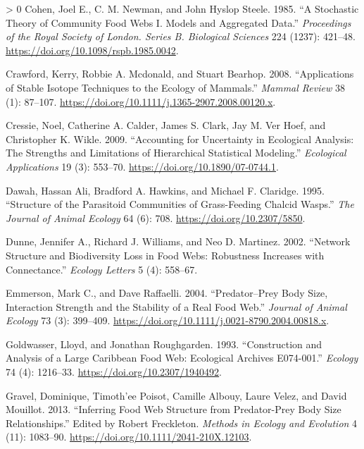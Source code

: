 \documentclass{article}
\newlength{\cslhangindent}
\newenvironment{CSLReferences}[3] %
 {%
  \setlength{\parindent}{0pt}
  \ifodd #1 \everypar{\setlength{\hangindent}{\cslhangindent}}\ignorespaces\fi
  \ifnum #2 > 0
  \setlength{\parskip}{#2\baselineskip}
  \fi
 }%
 {}
\begin{document}
\begin{CSLReferences}{1}{0}
\leavevmode\hypertarget{ref-cohenStochasticTheoryCommunity1985}{}%
Cohen, Joel E., C. M. Newman, and John Hyslop Steele. 1985. {``A
Stochastic Theory of Community Food Webs {I}. {Models} and Aggregated
Data.''} \emph{Proceedings of the Royal Society of London. Series B.
Biological Sciences} 224 (1237): 421--48.
\url{https://doi.org/10.1098/rspb.1985.0042}.

\leavevmode\hypertarget{ref-crawfordApplicationsStableIsotope2008}{}%
Crawford, Kerry, Robbie A. Mcdonald, and Stuart Bearhop. 2008.
{``Applications of Stable Isotope Techniques to the Ecology of
Mammals.''} \emph{Mammal Review} 38 (1): 87--107.
\url{https://doi.org/10.1111/j.1365-2907.2008.00120.x}.

\leavevmode\hypertarget{ref-cressieAccountingUncertaintyEcological2009}{}%
Cressie, Noel, Catherine A. Calder, James S. Clark, Jay M. Ver Hoef, and
Christopher K. Wikle. 2009. {``Accounting for Uncertainty in Ecological
Analysis: The Strengths and Limitations of Hierarchical Statistical
Modeling.''} \emph{Ecological Applications} 19 (3): 553--70.
\url{https://doi.org/10.1890/07-0744.1}.

\leavevmode\hypertarget{ref-dawahStructureParasitoidCommunities1995}{}%
Dawah, Hassan Ali, Bradford A. Hawkins, and Michael F. Claridge. 1995.
{``Structure of the {Parasitoid Communities} of {Grass}-{Feeding Chalcid
Wasps}.''} \emph{The Journal of Animal Ecology} 64 (6): 708.
\url{https://doi.org/10.2307/5850}.

\leavevmode\hypertarget{ref-dunneNetworkStructureBiodiversity}{}%
Dunne, Jennifer A., Richard J. Williams, and Neo D. Martinez. 2002.
{``Network Structure and Biodiversity Loss in Food Webs: Robustness
Increases with Connectance.''} \emph{Ecology Letters} 5 (4): 558--67.

\leavevmode\hypertarget{ref-emmersonPredatorPreyBody2004}{}%
Emmerson, Mark C., and Dave Raffaelli. 2004. {``Predator--Prey Body
Size, Interaction Strength and the Stability of a Real Food Web.''}
\emph{Journal of Animal Ecology} 73 (3): 399--409.
\url{https://doi.org/10.1111/j.0021-8790.2004.00818.x}.

\leavevmode\hypertarget{ref-goldwasserConstructionAnalysisLarge1993}{}%
Goldwasser, Lloyd, and Jonathan Roughgarden. 1993. {``Construction and
{Analysis} of a {Large Caribbean Food Web}: {Ecological Archives
E074}-001.''} \emph{Ecology} 74 (4): 1216--33.
\url{https://doi.org/10.2307/1940492}.

\leavevmode\hypertarget{ref-gravelInferringFoodWeb2013}{}%
Gravel, Dominique, Timoth'ee Poisot, Camille Albouy, Laure Velez, and
David Mouillot. 2013. {``Inferring Food Web Structure from Predator-Prey
Body Size Relationships.''} Edited by Robert Freckleton. \emph{Methods
in Ecology and Evolution} 4 (11): 1083--90.
\url{https://doi.org/10.1111/2041-210X.12103}.


\end{CSLReferences}
\end{document}
